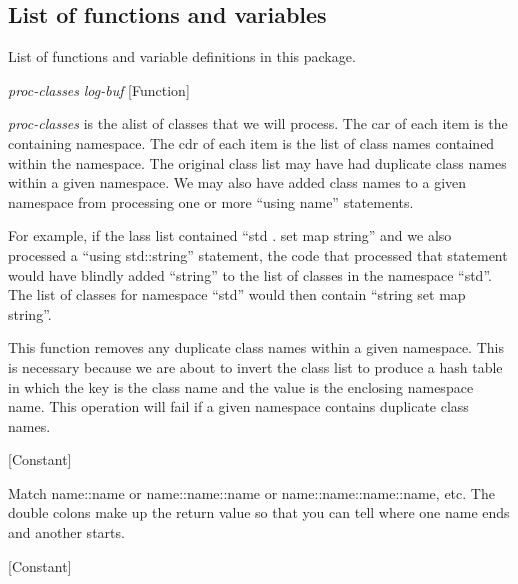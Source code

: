 \subsection{List of functions and variables}

List of functions and variable definitions in this package.



\vspace{1em}
\noindent
{}
\usebox{\funcname}\emph{proc-classes} \emph{log-buf}
 \hfill [Function]

\begin{doc-string}
\emph{proc-classes} is the alist of classes that we will process.  The car of each
item is the containing namespace.  The cdr of each item is the list of class
names contained within the namespace.  The original class list may have had
duplicate class names within a given namespace.  We may also have added class
names to a given namespace from processing one or more ``using name''
statements.

For example, if the lass list contained ``std . set map string'' and we also
processed a ``using std::string'' statement, the code that processed that
statement would have blindly added ``string'' to the list of classes in the
namespace ``std''.  The list of classes for namespace ``std'' would then contain
``string set map string''.

This function removes any duplicate class names within a given namespace.  This
is necessary because we are about to invert the class list to produce a hash
table in which the key is the class name and the value is the enclosing
namespace name.  This operation will fail if a given namespace contains
duplicate class names.
\end{doc-string}

\vspace{1em}
\noindent
{}
\usebox{\funcname}
 \hfill [Constant]

\begin{doc-string}
Match name::name or name::name::name or name::name::name::name, etc.  The
double colons make up the return value so that you can tell where one name
ends and another starts.
\end{doc-string}

\vspace{1em}
\noindent
{}
\usebox{\funcname}
 \hfill [Constant]

